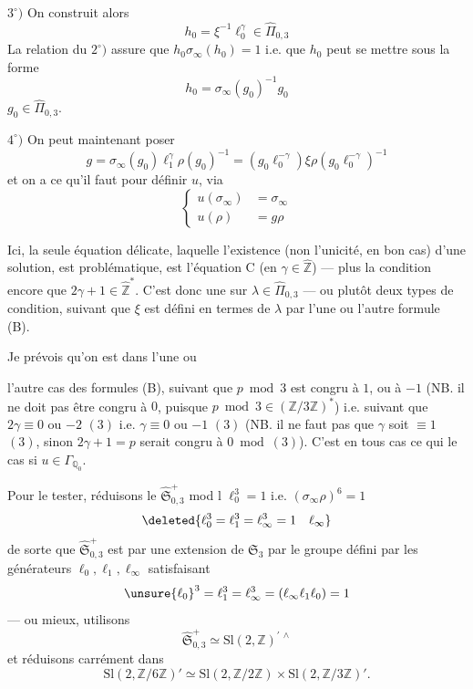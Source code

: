 
$3^\circ)$ On construit alors
\[
h_0=\xi^{-1}\ell_0^{\gamma}
\in\widehat{\Pi}_{0,3}
\]
La relation du $2^\circ)$ assure que $h_0\sigma_\infty(h_0)=1$ i.e.
que $h_0$ peut se mettre sous la forme
\[
h_0=\sigma_\infty(g_0)^{-1}g_0
\]
 $g_0\in\widehat{\Pi}_{0,3}$.


$4^\circ)$ On peut maintenant poser
\[
g=\sigma_\infty(g_0)\ell_1^{\gamma}\rho(g_0)^{-1}
=(g_0\ell_0^{-\gamma})\xi
\rho(g_0\ell_0^{-\gamma})^{-1}
\]
et on  a ce qu'il faut pour définir $u$, via
\[
\left\{
\begin{aligned}
u(\sigma_\infty)&=\sigma_\infty\\
u(\rho)&=g\rho
\end{aligned}
\right.
\]

Ici, la seule équation délicate,  laquelle
l'existence (non l'unicité, en bon cas) d'une solution, est problématique,
est l'équation C (en $\gamma\in\widehat{\mathbb Z}$)
--- plus la condition encore que $2\gamma+1\in\widehat{\mathbb Z}^{*}$.
C'est donc une 
sur $\lambda\in\widehat{\Pi}_{0,3}$ --- ou plutôt deux types de condition,
suivant que $\xi$ est défini en termes de $\lambda$ par
l'une ou l'autre formule (B).

Je prévois qu'on est dans l'une ou



l'autre cas des formules (B), suivant que $p\bmod 3$ est congru à $1$, ou à $-1$
(NB. il ne doit pas être congru à $0$, puisque $p\bmod 3\in(\mathbb Z/3\mathbb Z)^*$)
i.e. suivant que $2\gamma\equiv 0$ ou $-2$ $(3)$ i.e.
$\gamma\equiv 0$ ou $-1$ $(3)$
(NB. il ne faut pas que $\gamma$ soit $\equiv 1$ $(3)$,
sinon $2\gamma+1=p$ serait congru à $0\bmod(3)$).
C'est en tous cas ce qui  le cas si $u\in\Gamma_{\mathbb Q_0}$.

Pour le tester, réduisons le 
$\widehat{\mathfrak S}_{0,3}^{+}$
mod l
$\ell_0^3=1$ i.e. $(\sigma_\infty\rho)^6=1$
\[
\deleted{\ell_0^3=\ell_1^3=\ell_\infty^3=1\quad\ell_\infty}
\]
de sorte que $\widehat{\mathfrak S}_{0,3}^{+}$
est  par une extension de $\mathfrak S_3$
par le groupe défini par les générateurs $\ell_0,\ell_1,\ell_\infty$ satisfaisant
\[
\unsure{\ell_0}^3=\ell_1^3=\ell_\infty^3=(\ell_\infty\ell_1\ell_0)=1
\]
--- ou mieux, utilisons
\[
\widehat{\mathfrak S}_{0,3}^{+}
\simeq\mathrm{Sl}(2,\mathbb Z)^{\prime\,\wedge}
\]
et réduisons carrément dans
\[
\mathrm{Sl}(2,\mathbb Z/6\mathbb Z)'
\simeq\mathrm{Sl}(2,\mathbb Z/2\mathbb Z)
\times\mathrm{Sl}(2,\mathbb Z/3\mathbb Z)'.
\]

